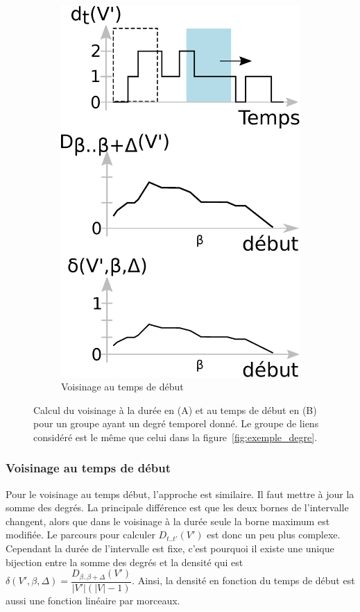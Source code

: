 \begin{figure}
\begin{subfigure}{0.4\textwidth}
		\includegraphics[width=0.8\linewidth]{img/GroupeDense/start_time.eps}
		\caption{Voisinage au temps de début}
		\label{fig:calcul_var_debut}
	\end{subfigure}\hspace*{0.05cm}

	\caption{Calcul du voisinage à la durée en (A) et au temps de début en (B) pour un groupe ayant un degré temporel donné. Le groupe de liens considéré est le même que celui dans la figure~\ref{fig:exemple_degre}.}
	\label{fig:calcul_var_dure_debut.}
\end{figure}

\subsubsection{Voisinage au temps de début}
Pour le voisinage au temps début, l'approche est similaire.
Il faut mettre à jour la somme des degrés.
La principale différence est que les deux bornes de l'intervalle changent, alors que dans le voisinage à la durée seule la borne maximum est modifiée.
Le parcours pour calculer $D_{t..t'}(V')$ est donc un peu plus complexe.
Cependant la durée de l'intervalle est fixe, c'est pourquoi il existe une unique bijection entre la somme des degrés et la densité qui est $\delta(V',\beta, \Delta)= \dfrac{D_{\beta..\beta+\Delta}(V')}{|V'|(|V|-1)}$.
Ainsi, la densité en fonction du temps de début est aussi une fonction linéaire par morceaux.

